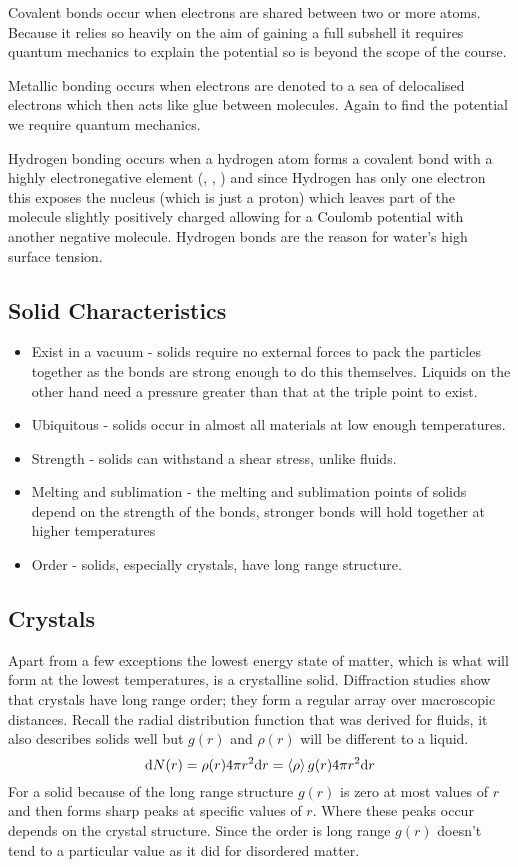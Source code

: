     Covalent bonds occur when electrons are shared between two or more atoms.
    Because it relies so heavily on the aim of gaining a full subshell it requires quantum mechanics to explain the potential so is beyond the scope of the course.
    
    Metallic bonding occurs when electrons are denoted to a sea of delocalised electrons which then acts like glue between molecules.
    Again to find the potential we require quantum mechanics.
    
    Hydrogen bonding occurs when a hydrogen atom forms a covalent bond with a highly electronegative element (, , ) and since Hydrogen has only one electron this exposes the nucleus (which is just a proton) which leaves part of the molecule slightly positively charged allowing for a Coulomb potential with another negative molecule.
    Hydrogen bonds are the reason for water's high surface tension.
    
    \subsection{Solid Characteristics}
    \begin{itemize}
        \item Exist in a vacuum - solids require no external forces to pack the particles together as the bonds are strong enough to do this themselves.
        Liquids on the other hand need a pressure greater than that at the triple point to exist.
        \item Ubiquitous - solids occur in almost all materials at low enough temperatures.
        \item Strength - solids can withstand a shear stress, unlike fluids.
        \item Melting and sublimation - the melting and sublimation points of solids depend on the strength of the bonds, stronger bonds will hold together at higher temperatures
        \item Order - solids, especially crystals, have long range structure.
    \end{itemize}
    
    \subsection{Crystals}
    Apart from a few exceptions the lowest energy state of matter, which is what will form at the lowest temperatures, is a crystalline solid.
    Diffraction studies show that crystals have long range order; they form a regular array over macroscopic distances.
    Recall the radial distribution function that was derived for fluids, it also describes solids well but \(g(r)\) and \(\rho(r)\) will be different to a liquid.
    \[\dd N(r) = \rho(r)4\pi r^2\dd r = \left\langle{\rho}\right\rangle g(r)4\pi r^2\dd r\]
    For a solid because of the long range structure \(g(r)\) is zero at most values of \(r\) and then forms sharp peaks at specific values of \(r\).
    Where these peaks occur depends on the crystal structure.
    Since the order is long range \(g(r)\) doesn't tend to a particular value as it did for disordered matter.
    
